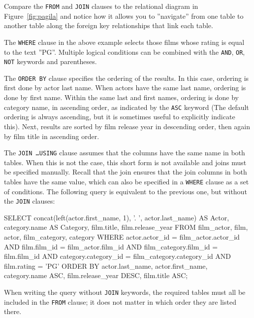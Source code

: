 Compare the \texttt{FROM} and \texttt{JOIN} clauses to the relational diagram in Figure~\ref{fig:pagila} and notice how it allows you to ''navigate'' from one table to another table along the foreign key relationships that link each table.

The \texttt{WHERE} clause in the above example selects those films whose rating is equal to the text ''PG''. Multiple logical conditions can be combined with the \texttt{AND}, \texttt{OR}, \texttt{NOT} keywords and parentheses.

The \texttt{ORDER BY} clause specifies the ordering of the results. In this case, ordering is first done by actor last name. When actors have the same last name, ordering is done by first name. Within the same last and first names, ordering is done by category name, in ascending order, as indicated by the \texttt{ASC} keyword (The default ordering is always ascending, but it is sometimes useful to explicitly indicate this). Next, results are sorted by film release year in descending order, then again by film title in ascending order.

The \texttt{JOIN \ldots USING} clause assumes that the columns have the same name in both tables. When this is not the case, this short form is not available and joins must be specified manually. Recall that the join ensures that the join columns in both tables have the same value, which can also be specified in a \texttt{WHERE} clause as a set of conditions. The following query is equivalent to the previous one, but without the \texttt{JOIN} clauses:

\begin{samepage}
\begin{sqlcode}
SELECT concat(left(actor.first_name, 1), '. ', 
           actor.last_name) AS Actor, 
       category.name AS Category, 
       film.title, 
       film.release_year
  FROM film_actor, film, actor, film_category, category
  WHERE actor.actor_id = film_actor.actor_id AND
        film.film_id = film_actor.film_id AND
        film_category.film_id = film.film_id AND
        category.category_id = film_category.category_id AND
        film.rating = 'PG'
  ORDER BY actor.last_name, 
           actor.first_name, 
           category.name ASC, 
           film.release_year DESC, 
           film.title ASC;
\end{sqlcode}
\end{samepage}

When writing the query without \texttt{JOIN} keywords, the required tables must all be included in the \texttt{FROM} clause; it does not matter in which order they are listed there.


